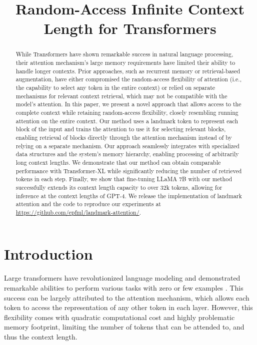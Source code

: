 \title{Random-Access Infinite Context Length for Transformers}

\begin{abstract}
While Transformers have shown remarkable success in natural language processing, their attention mechanism's large memory requirements have limited their ability to handle longer contexts. Prior approaches, such as recurrent memory or retrieval-based augmentation, have either compromised the random-access flexibility of attention (i.e., the capability to select any token in the entire context) or relied on separate mechanisms for relevant context retrieval, which may not be compatible with the model's attention. In this paper, we present a novel approach that allows access to the complete context while retaining random-access flexibility, closely resembling running attention on the entire context. Our method uses a landmark token to represent each block of the input and trains the attention to use it for selecting relevant blocks, enabling retrieval of blocks directly through the attention mechanism instead of by relying on a separate mechanism. Our approach seamlessly integrates with specialized data structures and the system's memory hierarchy, enabling processing of arbitrarily long context lengths. We demonstrate that our method can obtain comparable performance with Transformer-XL while significantly reducing the number of retrieved tokens in each step. Finally, we show that fine-tuning LLaMA 7B with our method successfully extends its context length capacity to over 32k tokens, allowing for inference at the context lengths of GPT-4. We release the implementation of landmark attention and the code to reproduce our experiments at \url{https://github.com/epfml/landmark-attention/}.
\end{abstract}

\section{Introduction}
Large transformers have revolutionized language modeling and demonstrated remarkable abilities to perform various tasks with zero or few examples \cite{brown_language_2020}. This success can be largely attributed to the attention mechanism, which allows each token to access the representation of any other token in each layer. However, this flexibility comes with quadratic computational cost and highly problematic memory footprint,  limiting the number of tokens that can be attended to, and thus the context length.

